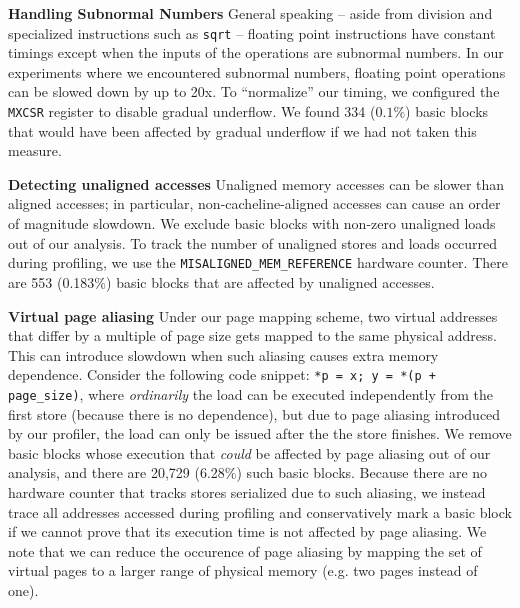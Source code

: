 \textbf{Handling Subnormal Numbers}
General speaking -- aside from division
and specialized instructions such as \verb|sqrt|
-- floating point instructions have constant timings
except when the inputs of the operations are subnormal numbers.
In our experiments where we encountered subnormal numbers,
floating point operations can be slowed down by up to 20x.
To ``normalize'' our timing, we configured the \verb|MXCSR| register
to disable gradual underflow.
We found 334 ($0.1\%$) basic blocks that would have been affected by 
gradual underflow if we had not taken this measure.

\textbf{Detecting unaligned accesses}
Unaligned memory accesses can be slower than aligned accesses; in particular,
non-cacheline-aligned accesses can cause
an order of magnitude slowdown.
We exclude basic blocks with non-zero unaligned loads out of our analysis.
To track the number of unaligned stores and loads occurred during profiling,
we use the 
\verb|MISALIGNED_MEM_REFERENCE| hardware counter.
There are 553 (0.183\%) basic blocks that are affected by unaligned accesses.

\textbf{Virtual page aliasing}
Under our page mapping scheme,
two virtual addresses that differ by a multiple of page size gets mapped to
the same physical address. This can introduce slowdown when such aliasing causes
extra memory dependence. Consider the following code snippet: \verb|*p = x; y = *(p + page_size)|, where
\textit{ordinarily} the load can be executed independently from the first store 
(because there is no dependence),
but due to page aliasing introduced by our profiler, the load can only be issued
after the the store finishes.
We remove basic blocks whose execution that \textit{could} be affected by
page aliasing out of our analysis,
and there are 20,729 (6.28\%) such basic blocks.
Because there are no hardware counter that tracks stores serialized due
to such aliasing, we instead trace all addresses accessed during profiling and
conservatively mark a basic block if we cannot prove that its execution time is not
affected by page aliasing.
We note that we can reduce the occurence of page aliasing by mapping the set of virtual
pages to a larger range of physical memory (e.g. two pages instead of one).

